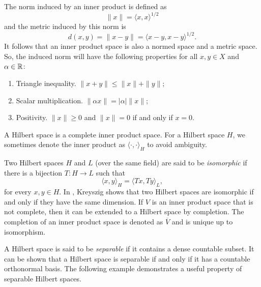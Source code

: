 The norm induced by an inner product is defined as
\[\|x\| = \langle x, x \rangle^{1/2}\]
and the metric induced by this norm is
\[d(x,y) = \|x - y\| = \langle x-y, x-y \rangle^{1/2}.\]
It follows that an inner product space is also a normed space and a metric space.
So, the induced norm will have the following properties for all \(x,y \in X\) and \(\alpha \in \mathbb{R}\):
\begin{enumerate}
    \item Triangle inequality. \(\|x + y \| \leq \|x\| + \|y\|\);
    \item Scalar multiplication. \(\|\alpha x\| = |\alpha| \|x\|\);
    \item Positivity. \(\|x\| \geq 0\) and \(\|x\| = 0\) if and only if \(x = 0\). 
\end{enumerate}

\begin{definition}
    A Hilbert space is a complete inner product space.
    For a Hilbert space \(H\), we sometimes denote the inner product as \(\langle \cdot, \cdot \rangle_H\) to avoid ambiguity.
\end{definition}

Two Hilbert spaces \(H\) and \(L\) (over the same field) are said to be \textit{isomorphic} if there is a bijection \(T : H \to L\) such that
\begin{equation}
    \label{eqn:hilbert-space-isomorphism}
    \langle x, y \rangle_H = \langle Tx, Ty \rangle_L,
\end{equation}
for every \(x, y \in H\).
In \cite{kreyszig1991introductory}, Kreyszig shows that two Hilbert spaces are isomorphic if and only if they have the same dimension.
If \(V\) is an inner product space that is not complete, then it can be extended to a Hilbert space by completion.
The completion of an inner product space is denoted as \(\overline{V}\) and is unique up to isomorphism.

A Hilbert space is said to be \textit{separable} if it contains a dense countable subset.
It can be shown \cite{kreyszig1991introductory} that a Hilbert space is separable if and only if it has a countable orthonormal basis.
The following example demonstrates a useful property of separable Hilbert spaces.

